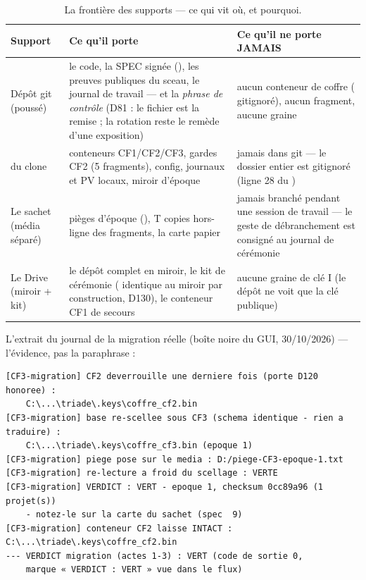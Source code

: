 \begin{table}[htbp]
\centering\small
\caption{La frontière des supports — ce qui vit où, et pourquoi.}
\label{tab:frontiere}
\begin{tabularx}{\textwidth}{@{}l Y Y@{}}
\toprule
\textbf{Support} & \textbf{Ce qu'il porte} & \textbf{Ce qu'il ne porte JAMAIS} \\
\midrule
Dépôt git (poussé) & le code, la SPEC signée (), les preuves publiques du
sceau, le journal de travail — et la \emph{phrase de contrôle} (D81 : le fichier est la
remise ; la rotation reste le remède d'une exposition) & aucun conteneur de coffre
( gitignoré), aucun fragment, aucune graine \\
 du clone & conteneurs CF1/CF2/CF3, gardes CF2 (5 fragments), config,
journaux et PV locaux, miroir d'époque & jamais dans git — le dossier entier est
gitignoré (ligne 28 du ) \\
Le sachet (média séparé) & pièges d'époque (), T copies
hors-ligne des fragments, la carte papier & jamais branché pendant une session de
travail — le geste de débranchement est consigné au journal de cérémonie \\
Le Drive (miroir + kit) & le dépôt complet en miroir, le kit de cérémonie
( identique au miroir par construction, D130), le conteneur CF1 de secours &
aucune graine de clé I (le dépôt ne voit que la clé publique) \\
\bottomrule
\end{tabularx}
\end{table}

L'extrait du journal de la migration réelle (boîte noire du GUI, 30/10/2026) —
l'évidence, pas la paraphrase :

\begin{lstlisting}
[CF3-migration] CF2 deverrouille une derniere fois (porte D120 honoree) :
    C:\...\triade\.keys\coffre_cf2.bin
[CF3-migration] base re-scellee sous CF3 (schema identique - rien a traduire) :
    C:\...\triade\.keys\coffre_cf3.bin (epoque 1)
[CF3-migration] piege pose sur le media : D:/piege-CF3-epoque-1.txt
[CF3-migration] re-lecture a froid du scellage : VERTE
[CF3-migration] VERDICT : VERT - epoque 1, checksum 0cc89a96 (1 projet(s))
    - notez-le sur la carte du sachet (spec  9)
[CF3-migration] conteneur CF2 laisse INTACT : C:\...\triade\.keys\coffre_cf2.bin
--- VERDICT migration (actes 1-3) : VERT (code de sortie 0,
    marque « VERDICT : VERT » vue dans le flux)
\end{lstlisting}

